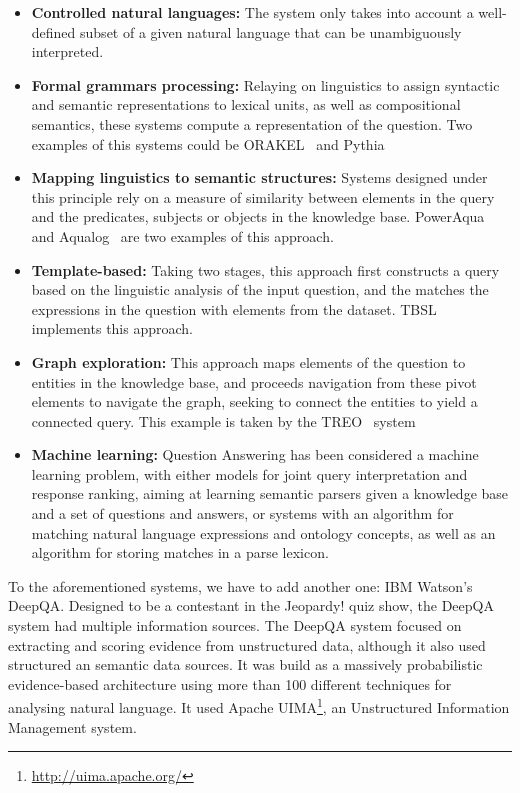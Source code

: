 \begin{itemize}
  \item \textbf{Controlled natural languages:} The system only takes into account a well-defined subset of a given natural language that can be unambiguously interpreted.
  \item \textbf{Formal grammars processing:} Relaying on linguistics to assign syntactic and semantic representations to lexical units, as well as compositional semantics, these systems compute a representation of the question. Two examples of this systems could be ORAKEL~\cite{cimiano2008towards} and Pythia~\cite{unger2011pythia}
  \item \textbf{Mapping linguistics to semantic structures:} Systems designed under this principle rely on a measure of similarity between elements in the query and the predicates, subjects or objects in the knowledge base. PowerAqua~\cite{lopez2011poweraqua} and Aqualog~\cite{lopez2007aqualog} are two examples of this approach.
  \item \textbf{Template-based:} Taking two stages, this approach first constructs a query based on the linguistic analysis of the input question, and the matches the expressions in the question with elements from the dataset. TBSL~\cite{unger2012template} implements this approach.
  \item \textbf{Graph exploration:} This approach maps elements of the question to entities in the knowledge base, and proceeds navigation from these pivot elements to navigate the graph, seeking to connect the entities to yield a connected query. This example is taken by the TREO~\cite{freitas2011querying} system
  \item \textbf{Machine learning:} Question Answering has been considered a machine learning problem, with either models for joint query interpretation and response ranking, aiming at learning semantic parsers given a knowledge base and a set of questions and answers, or systems with an algorithm for matching natural language expressions and ontology concepts, as well as an algorithm for storing matches in a parse lexicon.
\end{itemize}


To the aforementioned systems, we have to add another one: IBM Watson's DeepQA. Designed to be a contestant in the Jeopardy! quiz show, the DeepQA system had multiple information sources. The DeepQA system focused on extracting and scoring evidence from unstructured data, although it also used structured an semantic data sources. It was build as a massively probabilistic evidence-based architecture using more than 100 different techniques for analysing natural language. It used Apache UIMA\footnote{\url{http://uima.apache.org/}}, an Unstructured Information Management system.

